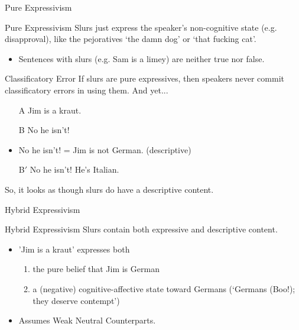 \documentclass[xcolor=dvipsnames,12pt,handout]{beamer}
\begin{document}
\begin{frame}{Pure Expressivism}
\pause
\begin{block}{Pure Expressivism}
 Slurs just express the speaker's non-cognitive state (e.g. disapproval), like the pejoratives `the damn dog' or `that fucking cat'.
 \begin{itemize}
 \item Sentences with slurs (e.g. Sam is a limey) are neither true nor false. 
 \end{itemize} 
\end{block}
\begin{block}{Classificatory Error}
\pause
If slurs are pure expressives, then speakers never commit classificatory errors in using them. And yet...
\pause
\begin{itemize} 
\item[A] Jim is a kraut.
\pause
\item[B] No he isn't!
\pause
\item  No he isn't! = Jim is not German. \alert{(descriptive)}
\pause
\item[B$'$] No he isn't! He's Italian.
\end{itemize}
\end{block}
\pause
\medskip
So, it looks as though slurs do have a descriptive content.
\end{frame}

\begin{frame}{Hybrid Expressivism}
\begin{block}{Hybrid Expressivism}
 Slurs contain both expressive and descriptive content.
 \pause
 \begin{itemize}
 \item 'Jim is a kraut' expresses both
 \begin{enumerate}
 \item the pure belief that Jim is German
 \item a (negative) cognitive-affective state toward Germans (`Germans (Boo!); they deserve contempt')
 \end{enumerate}
 \pause
 \item Assumes Weak Neutral Counterparts.
 \end{itemize}
\end{block}

\end{frame}
\end{document}
